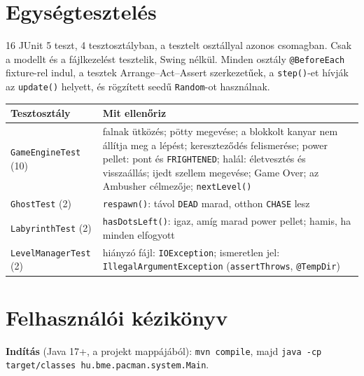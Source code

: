 \documentclass[11pt, a4paper]{article}
\begin{document}
\section{Egységtesztelés}
16 JUnit 5 teszt, 4 tesztosztályban, a tesztelt osztállyal azonos csomagban. Csak a modellt és a fájlkezelést tesztelik, Swing nélkül. Minden osztály \texttt{@BeforeEach} fixture-rel indul, a tesztek Arrange--Act--Assert szerkezetűek, a \texttt{step()}-et hívják az \texttt{update()} helyett, és rögzített seedű \texttt{Random}-ot használnak.

\vspace{0.1cm}
\begin{tabular}{@{}p{3.4cm}p{12.0cm}@{}}
    \toprule
    \textbf{Tesztosztály} & \textbf{Mit ellenőriz} \\
    \midrule
    \texttt{GameEngineTest} (10) & falnak ütközés; pötty megevése; a blokkolt kanyar nem állítja meg a lépést; kereszteződés felismerése; power pellet: pont és \texttt{FRIGHTENED}; halál: életvesztés és visszaállás; ijedt szellem megevése; Game Over; az Ambusher célmezője; \texttt{nextLevel()} \\
    \texttt{GhostTest} (2) & \texttt{respawn()}: távol \texttt{DEAD} marad, otthon \texttt{CHASE} lesz \\
    \texttt{LabyrinthTest} (2) & \texttt{hasDotsLeft()}: igaz, amíg marad power pellet; hamis, ha minden elfogyott \\
    \texttt{LevelManagerTest} (2) & hiányzó fájl: \texttt{IOException}; ismeretlen jel: \texttt{IllegalArgumentException} (\texttt{assertThrows}, \texttt{@TempDir}) \\
    \bottomrule
\end{tabular}
\newpage
\section{Felhasználói kézikönyv}
\textbf{Indítás} (Java 17+, a projekt mappájából): \texttt{mvn compile}, majd \texttt{java -cp target/classes hu.bme.pacman.system.Main}.
\end{document}
